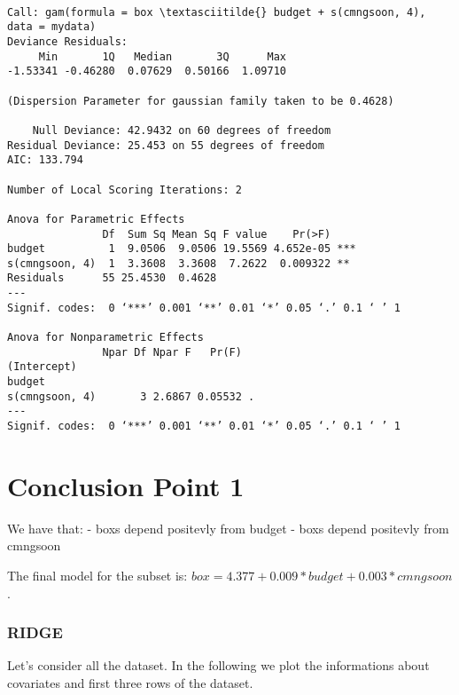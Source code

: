 \documentclass[11pt]{article}
\begin{document}
    
    \begin{Verbatim}[commandchars=\\\{\}]

Call: gam(formula = box \textasciitilde{} budget + s(cmngsoon, 4), data = mydata)
Deviance Residuals:
     Min       1Q   Median       3Q      Max 
-1.53341 -0.46280  0.07629  0.50166  1.09710 

(Dispersion Parameter for gaussian family taken to be 0.4628)

    Null Deviance: 42.9432 on 60 degrees of freedom
Residual Deviance: 25.453 on 55 degrees of freedom
AIC: 133.794 

Number of Local Scoring Iterations: 2 

Anova for Parametric Effects
               Df  Sum Sq Mean Sq F value    Pr(>F)    
budget          1  9.0506  9.0506 19.5569 4.652e-05 ***
s(cmngsoon, 4)  1  3.3608  3.3608  7.2622  0.009322 ** 
Residuals      55 25.4530  0.4628                      
---
Signif. codes:  0 ‘***’ 0.001 ‘**’ 0.01 ‘*’ 0.05 ‘.’ 0.1 ‘ ’ 1

Anova for Nonparametric Effects
               Npar Df Npar F   Pr(F)  
(Intercept)                            
budget                                 
s(cmngsoon, 4)       3 2.6867 0.05532 .
---
Signif. codes:  0 ‘***’ 0.001 ‘**’ 0.01 ‘*’ 0.05 ‘.’ 0.1 ‘ ’ 1
    \end{Verbatim}

    
    \hypertarget{conclusion-point-1}{%
\section{Conclusion Point 1}\label{conclusion-point-1}}

We have that: - boxs depend positevly from budget - boxs depend
positevly from cmngsoon

The final model for the subset is:
\(box=4.377+ 0.009* budget +0.003* cmngsoon\).

    \hypertarget{ridge}{%
\subsubsection{RIDGE}\label{ridge}}

Let's consider all the dataset. In the following we plot the
informations about covariates and first three rows of the dataset.
\end{document}
